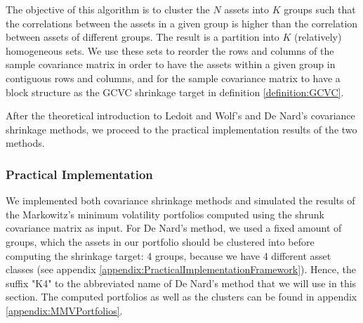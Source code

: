         The objective of this algorithm is to cluster the $N$ assets into $K$ groups such that the correlations between the assets in a given group is higher than the correlation between assets of different groups. The result is a partition into $K$ (relatively) homogeneous sets. We use these sets to reorder the rows and columns of the sample covariance matrix in order to have the assets within a given group in contiguous rows and columns, and for the sample covariance matrix to have a block structure as the GCVC shrinkage target in definition \ref{definition:GCVC}.
        
        After the theoretical introduction to Ledoit and Wolf's and De Nard's covariance shrinkage methods, we proceed to the practical implementation results of the two methods.
    
    \subsubsection{Practical Implementation}
        
        We implemented both covariance shrinkage methods and simulated the results of the Markowitz's minimum volatility portfolios computed using the shrunk covariance matrix as input. For De Nard's method, we used a fixed amount of groups, which the assets in our portfolio should be clustered into before computing the shrinkage target: 4 groups, because we have 4 different asset classes (see appendix \ref{appendix:PracticalImplementationFramework}). Hence, the suffix "K4" to the abbreviated name of De Nard's method that we will use in this section. The computed portfolios as well as the clusters can be found in appendix \ref{appendix:MMVPortfolios}.
        

